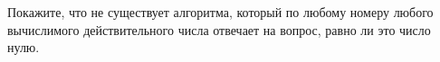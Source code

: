 Покажите, что не существует алгоритма, который по любому номеру любого вычислимого действительного числа отвечает на вопрос,
равно ли это число нулю.